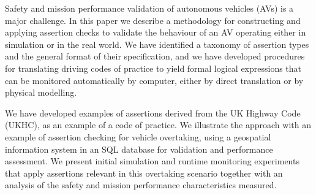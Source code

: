 Safety and mission performance validation of autonomous vehicles (AVs) is a major challenge. In this paper we describe a methodology for constructing and applying assertion checks to validate the behaviour of an AV operating either in simulation or in the real world. We have identified a taxonomy of assertion types and the general format of their specification, and we have developed procedures for translating driving codes of practice to yield formal logical expressions that can be monitored automatically by computer, either by direct translation or by physical modelling.

We have developed examples of assertions derived from the UK Highway Code (UKHC), as an example of a code of practice. 
%
%
We illustrate the approach with an example of assertion checking for vehicle overtaking, using a geospatial information system in an SQL database for validation and performance assessment.
%
We present initial simulation and runtime monitoring 
experiments that apply assertions relevant in this overtaking scenario together with an analysis of the safety and mission performance characteristics measured.
%
